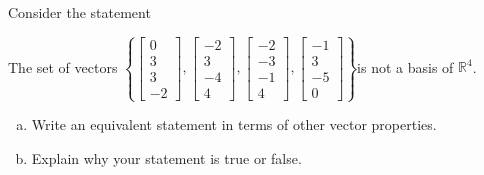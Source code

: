 
\begin{exerciseStatement}


Consider the statement 
\begin{center}\begin{minipage}{0.8\textwidth}
 The set of vectors \( \left\{ \left[\begin{array}{c}
0 \\
3 \\
3 \\
-2
\end{array}\right] , \left[\begin{array}{c}
-2 \\
3 \\
-4 \\
4
\end{array}\right] , \left[\begin{array}{c}
-2 \\
-3 \\
-1 \\
4
\end{array}\right] , \left[\begin{array}{c}
-1 \\
3 \\
-5 \\
0
\end{array}\right] \right\} \)is not a basis of \(\mathbb{R}^4\). 
\end{minipage}\end{center}
    


\begin{enumerate}[(a)]
\item  Write an equivalent statement in terms of other vector properties.
\item  Explain why your statement is true or false.
\end{enumerate}
    
\end{exerciseStatement}
    
